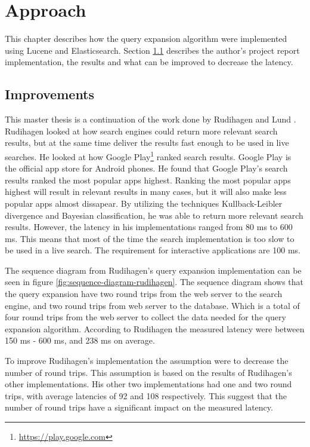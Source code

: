 \chapter{Approach}
\label{ch:approach}
This chapter describes how the query expansion algorithm were implemented using Lucene and Elasticsearch.
Section \ref{sec:improvements} describes the author's project report \cite{project-report} implementation,
the results and what can be improved to decrease the latency.

\section{Improvements}
\label{sec:improvements}
This master thesis is a continuation of the work done by Rudihagen \cite{master-thesis} and Lund \cite{project-report}.
Rudihagen looked at how search engines could return more relevant search results,
but at the same time deliver the results fast enough to be used in live searches.
He looked at how Google Play\footnote{\url{https://play.google.com}} ranked search results.
Google Play is the official app store for Android phones.
He found that Google Play's search results ranked the most popular apps highest.
Ranking the most popular apps highest will result in relevant results in many cases,
but it will also make less popular apps almost dissapear.
By utilizing the techniques Kullback-Leibler divergence and Bayesian classification,
he was able to return more relevant search results.
However, the latency in his implementations ranged from 80 ms to 600 ms.
This means that most of the time the search implementation is too slow to be used in a live search.
The requirement for interactive applications are 100 ms.

The sequence diagram from Rudihagen's query expansion implementation can be seen in figure \ref{fig:sequence-diagram-rudihagen}.
The sequence diagram shows that the query expansion have two round trips from the web server to the search engine,
and two round trips from web server to the database.
Which is a total of four round trips from the web server to collect the data needed for the query expansion algorithm.
According to Rudihagen the measured latency were between 150 ms - 600 ms, and 238 ms on average.

To improve Rudihagen's implementation the assumption were to decrease the number of round trips.
This assumption is based on the results of Rudihagen's other implementations.
His other two implementations had one and two round trips,
with average latencies of 92 and 108 respectively.
This suggest that the number of round trips have a significant impact on the measured latency.

